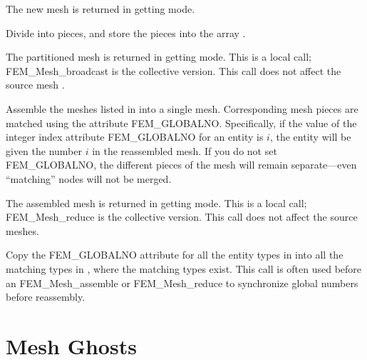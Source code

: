   The new mesh is returned in getting mode.


Divide  into  pieces, and store the pieces
into the array . 

The partitioned mesh is returned in getting mode.
This is a local call; FEM\_Mesh\_broadcast is the collective version.
This call does not affect the source mesh .

  

Assemble the  meshes listed in  into
a single mesh.  Corresponding mesh pieces are matched using 
the attribute FEM\_GLOBALNO.  Specifically, if the value of 
the integer index attribute FEM\_GLOBALNO for an entity is $i$,
the entity will be given the number $i$ in the reassembled mesh.
If you do not set FEM\_GLOBALNO, the different pieces of the 
mesh will remain separate---even ``matching'' nodes will not be merged.

The assembled mesh is returned in getting mode.
This is a local call; FEM\_Mesh\_reduce is the collective version.
This call does not affect the source meshes.



Copy the FEM\_GLOBALNO attribute for all the entity types in 
 into all the matching types in ,
where the matching types exist.  This call is often used 
before an FEM\_Mesh\_assemble or FEM\_Mesh\_reduce to synchronize
global numbers before reassembly.



\section{Mesh Ghosts}
\label{sec:ghost}

